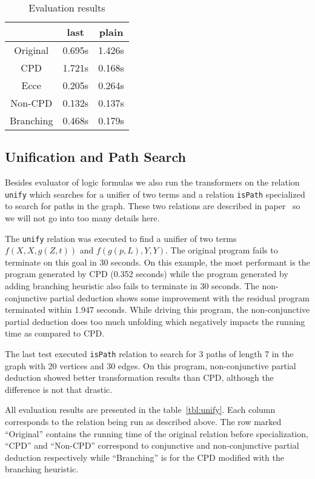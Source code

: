 \begin{table}
  \centering
  \begin{tabular}{c||c||c}
                   & last    & plain  \\
  \hline\hline
  Original         & 0.695s  & 1.426s \\
  \hline
  CPD              & 1.721s  & 0.168s \\
  \hline
  Ecce             & 0.205s  & 0.264s \\
  \hline
  Non-CPD          & 0.132s  & 0.137s \\
  \hline
  Branching        & 0.468s  & 0.179s \\
  \end{tabular}

  \caption{Evaluation results}
  \label{tbl:eval}
\end{table}


\subsection{Unification and Path Search}

Besides evaluator of logic formulas we also run the transformers on the relation \lstinline{unify} which searches for a unifier of two terms and a relation \lstinline{isPath} specialized to search for paths in the graph.
These two relations are described in paper~\cite{lozov2019relational} so we will not go into too many details here.

The \lstinline{unify} relation was executed to find a unifier of two terms $f(X, X, g(Z, t))$ and $f(g(p, L), Y, Y)$.
The original \mk{} program fails to terminate on this goal in 30 seconds.
On this example, the most performant is the program generated by CPD (0.352 seconds) while the program generated by adding branching heuristic also fails to terminate in 30 seconds.
The non-conjunctive partial deduction shows some improvement with the residual program terminated within 1.947 seconds.
While driving this program, the non-conjunctive partial deduction does too much unfolding which negatively impacts the running time as compared to CPD.

The last test executed \lstinline{isPath} relation to search for 3 paths of length 7 in the graph with 20 vertices and 30 edges.
On this program, non-conjunctive partial deduction showed better transformation results than CPD, although the difference is not that drastic.

All evaluation results are presented in the table~\ref{tbl:unify}.
Each column corresponds to the relation being run as described above.
The row marked ``Original'' contains the running time of the original \mk{} relation before specialization, ``CPD'' and ``Non-CPD'' correspond to conjunctive and non-conjunctive partial deduction respectively while ``Branching'' is for the CPD modified with the branching heuristic.

